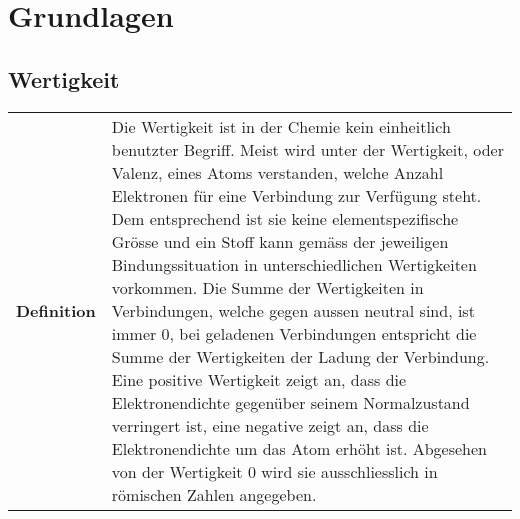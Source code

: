 \section{Grundlagen}

\subsection{Wertigkeit}
\begin{longtable}{p{3cm}p{14cm}}
	\textbf{Definition}
		& Die Wertigkeit ist in der Chemie kein einheitlich benutzter Begriff. Meist wird unter der Wertigkeit, oder Valenz, eines Atoms verstanden, welche Anzahl Elektronen für eine Verbindung zur Verfügung steht. Dem entsprechend ist sie keine elementspezifische Grösse und ein Stoff kann gemäss der jeweiligen Bindungssituation in unterschiedlichen Wertigkeiten vorkommen. Die Summe der Wertigkeiten in Verbindungen, welche gegen aussen neutral sind, ist immer 0, bei geladenen Verbindungen entspricht die Summe der Wertigkeiten der Ladung der Verbindung. Eine positive Wertigkeit zeigt an, dass die Elektronendichte gegenüber seinem Normalzustand verringert ist, eine negative zeigt an, dass die Elektronendichte um das Atom erhöht ist. Abgesehen von der Wertigkeit 0 wird sie ausschliesslich in römischen Zahlen angegeben.\\
\end{longtable}

